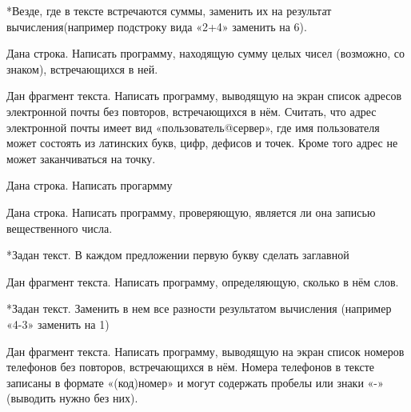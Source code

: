 *\task Везде, где в тексте встречаются суммы, заменить их на результат
вычисления(например подстроку вида «2+4» заменить на 6).

\task Дана строка. Написать программу, находящую сумму целых чисел (возможно, со знаком), встречающихся в ней.

\task Дан фрагмент текста. Написать программу, выводящую на экран список адресов электронной почты без повторов, встречающихся в нём. Считать, что адрес электронной почты имеет вид «пользователь@сервер», где имя пользователя может состоять из латинских букв, цифр, дефисов и точек. Кроме того адрес не может заканчиваться на точку.

\task Дана строка. Написать прогармму

\task Дана строка. Написать программу, проверяющую, является ли она записью вещественного числа.

*\task Задан текст. В каждом предложении первую букву сделать заглавной

\task Дан фрагмент текста. Написать программу, определяющую, сколько в нём слов.

*\task Задан текст. Заменить в нем все разности результатом вычисления
(например «4-3» заменить на 1)

\task Дан фрагмент текста. Написать программу, выводящую на экран список номеров телефонов без повторов, встречающихся в нём. Номера телефонов в тексте записаны в формате «(код)номер» и могут содержать пробелы или знаки «-» (выводить нужно без них).

